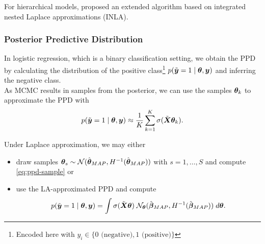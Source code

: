 For hierarchical models, \citet{rue_approximate_2009} proposed an extended algorithm based on integrated nested Laplace approximations (INLA).

\subsubsection*{Posterior Predictive Distribution}

In logistic regression, which is a binary classification setting, we obtain the PPD by calculating the distribution of the positive class\footnote{
    Encoded here with $y_i \in \{0 \text{ (negative)}, 1 \text{ (positive)}\}$
} $p(\tilde{\bm{y}} = 1 \mid \bm{\theta}, \bm{y})$ and inferring the negative class.\\

As MCMC results in samples from the posterior, we can use the samples $\bm{\theta}_k$ to approximate the PPD with
\begin{equation}\label{eq:ppd-sample}
    p(\tilde{\bm{y}} = 1 \mid \bm{\theta}, \bm{y}) \approx \frac{1}{K} \sum_{k=1}^{K} \sigma(\tilde{\bm{X}} \bm{\theta}_k).
\end{equation}

Under Laplace approximation, we may either
\begin{itemize}
    \item draw samples $\bm{\theta}_s \sim \mathcal{N}(\hat{\bm{\theta}}_{MAP}, H^{-1}(\hat{\bm{\theta}}_{MAP}))$ with $s = 1, \dots, S$ and compute \autoref{eq:ppd-sample} or
    \item use the LA-approximated PPD and compute
    \begin{equation*}
        p(\tilde{\bm{y}} = 1 \mid \bm{\theta}, \bm{y}) = \int \sigma(\tilde{\bm{X}} \bm{\theta}) \; \mathcal{N}_{\bm{\theta}}(\hat{\bm{\beta}}_{MAP}, H^{-1} (\hat{\bm{\beta}}_{MAP})) \; d \bm{\theta}.
    \end{equation*}
\end{itemize}
